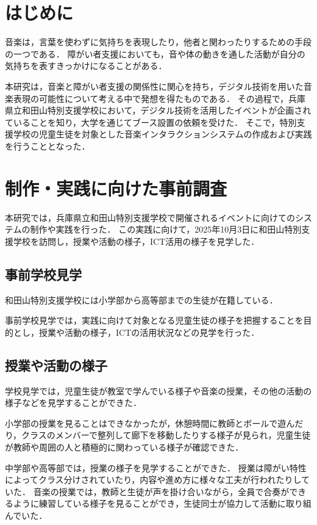 \section{はじめに}
音楽は，言葉を使わずに気持ちを表現したり，他者と関わったりするための手段の一つである．
障がい者支援においても，音や体の動きを通した活動が自分の気持ちを表すきっかけになることがある．

本研究は，音楽と障がい者支援の関係性に関心を持ち，デジタル技術を用いた音楽表現の可能性について考える中で発想を得たものである．
その過程で，兵庫県立和田山特別支援学校において，デジタル技術を活用したイベントが企画されていることを知り，大学を通じてブース設置の依頼を受けた．
そこで，特別支援学校の児童生徒を対象とした音楽インタラクションシステムの作成および実践を行うこととなった．

\section{制作・実践に向けた事前調査}
本研究では，兵庫県立和田山特別支援学校\cite{zotero-item-10409}で開催されるイベントに向けてのシステムの制作や実践を行った．
この実践に向けて，2025年10月3日に和田山特別支援学校を訪問し，授業や活動の様子，ICT活用の様子を見学した．


\subsection{事前学校見学}
和田山特別支援学校には小学部から高等部までの生徒が在籍している．

事前学校見学では，実践に向けて対象となる児童生徒の様子を把握することを目的とし，授業や活動の様子，ICTの活用状況などの見学を行った．


\subsection{授業や活動の様子}
学校見学では，児童生徒が教室で学んでいる様子や音楽の授業，その他の活動の様子などを見学することができた．

小学部の授業を見ることはできなかったが，休憩時間に教師とボールで遊んだり，クラスのメンバーで整列して廊下を移動したりする様子が見られ，児童生徒が教師や周囲の人と積極的に関わっている様子が確認できた．

中学部や高等部では，授業の様子を見学することができた．
授業は障がい特性によってクラス分けされていたり，内容や進め方に様々な工夫が行われたりしていた．
音楽の授業では，教師と生徒が声を掛け合いながら，全員で合奏ができるように練習している様子を見ることができ，生徒同士が協力して活動に取り組んでいた．


